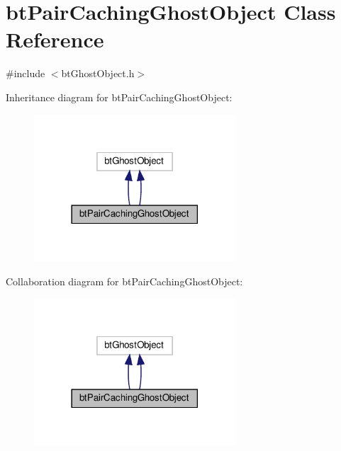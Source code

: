 \hypertarget{classbtPairCachingGhostObject}{}\section{bt\+Pair\+Caching\+Ghost\+Object Class Reference}
\label{classbtPairCachingGhostObject}


{\ttfamily \#include $<$bt\+Ghost\+Object.\+h$>$}



Inheritance diagram for bt\+Pair\+Caching\+Ghost\+Object\+:
\nopagebreak
\begin{figure}[H]
\begin{center}
\leavevmode
\includegraphics[width=213pt]{classbtPairCachingGhostObject__inherit__graph}
\end{center}
\end{figure}


Collaboration diagram for bt\+Pair\+Caching\+Ghost\+Object\+:
\nopagebreak
\begin{figure}[H]
\begin{center}
\leavevmode
\includegraphics[width=213pt]{classbtPairCachingGhostObject__coll__graph}
\end{center}
\end{figure}
